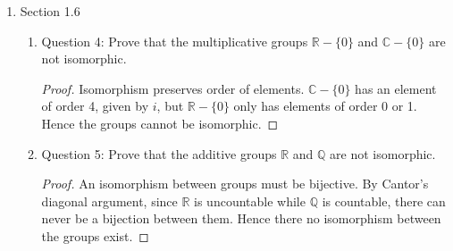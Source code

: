 \documentclass{article}
\begin{document}
\begin{enumerate}
\begin{proof}
      Replacing each element in $Q_8$ by its numbering, we get the
      following table:

      \begin{center}
        \begin{tabular}{|l||l|}
          \hline
          $1$   & $()$ \\ \hline
          $2$   & $(1,2,3,3)\circ(5,6,7,8)$ \\ \hline
          $3$   & $(1,3)\circ(2,4)\circ(5,7)\circ(6,8)$ \\ \hline
          $4$   & $(1,4,3,2)\circ(5,8,7,6)$ \\ \hline
          $5$   & $(1,5,3,7)\circ(2,8,4,6)$ \\ \hline
          $6$   & $(1,6,3,8)\circ(2,5,4,7)$ \\ \hline
          $7$   & $(1,7,3,5)\circ(2,6,4,8)$ \\ \hline
          $8$   & $(1,8,3,6)\circ(2,7,4,5)$ \\ \hline
        \end{tabular}
      \end{center}
    \end{proof}

  \item Section 1.6
    \begin{enumerate}
      \item Question 4: Prove that the multiplicative groups
        $\mathbb{R}-\{0\}$ and $\mathbb{C}-\{0\}$ are not isomorphic.

        \begin{proof}
          Isomorphism preserves order of elements. $\mathbb{C}-\{0\}$ has
          an element of order 4, given by $i$, but $\mathbb{R}-\{0\}$ only
          has elements of order 0 or 1. Hence the groups cannot be
          isomorphic.
        \end{proof}

      \item Question 5: Prove that the additive groups $\mathbb{R}$ and
        $\mathbb{Q}$ are not isomorphic.

        \begin{proof}
          An isomorphism between groups must be bijective. By Cantor's
          diagonal argument, since $\mathbb{R}$ is uncountable while
          $\mathbb{Q}$ is countable, there can never be a bijection between
          them. Hence there no isomorphism between the groups exist. 
        \end{proof}


\end{enumerate}
\end{enumerate}
\end{document}
